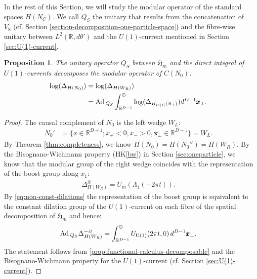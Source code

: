 \documentclass[12pt]{article}
\def\RR{{\mathbb R}}
\def\hm{\mathfrak{H}_m}
\def\Ad{{\hbox{\rm Ad\,}}}
\def\uone{{\rm U(1)}}
\newtheorem{proposition}[theorem]{Proposition}
\theoremstyle{remark}
\begin{document}
In the rest of this Section, we will study the modular operator of the standard spaces $H(N_C)$.
We call $Q_S$ the unitary that results from the concatenation of $V_{\mathrm S}$ (cf.\! Section \ref{section-decomposition-one-particle-space}) and the fibre-wise unitary between $L^2(\RR,d\theta')$ and the $U(1)$-current mentioned in Section \ref{sec:U(1)-current}.
	

  \begin{proposition}\label{pr:modular-operator-zero-space}
   The unitary operator $Q_S$ between $\hm$ and the direct integral of $U(1)$-currents decomposes the modular operator of $C(N_0)$:
    \begin{align*}
     \log(\Delta_{H(N_0)})&=\log(\Delta_{H(W_R)})\\&=\Ad_{Q_S}\int^{\oplus}_{\RR^{D-1}} \log(\Delta_{H_{U(1)}(\RR_+)})d^{D-1}\pmb{x}_\perp.
    \end{align*}
  \end{proposition}
  \begin{proof}
   The causal complement of $N_0$ is the left wedge $W_L$:
    \begin{align*}
     N_0'
     &=\{x\in \RR^{D+1}; x_+< 0,x_->0,\pmb{x}_\perp\in \RR^{D-1}\}=W_L.
    \end{align*}
   By Theorem \ref{thm:completeness}, we know $H(N_0)=H(N_0'')=H(W_R)$.
   By the Bisognano-Wichmann property (HK\ref{bw}) in Section \ref{sec:oneparticle},
   we know that the modular group of the right wedge coincides with the representation of the boost group along $x_1$:
   		\begin{align*}
   			 \Delta_{H(W_R)}^{it}= U_m(\Lambda_{1}(-2\pi t)).
   		\end{align*}
   	By \eqref{eq:non-const-dilations} the representation of the boost group is equivalent to
   	the constant dilation group of the $U(1)$-current on each fibre of the spatial decomposition of $\hm$ and hence:
   		\begin{align*}
   			\Ad_{Q_S}\Delta_{H(W_R)}^{-it}=\int^{\oplus}_{\RR^{D-1}} U_\uone(2\pi t,0)\,d^{D-1}\pmb{x}_\perp.
   		\end{align*}
   	The statement follows from \autoref{prop:functional-calculus-decomposable} and the Bisognano-Wichmann property for the $U(1)$-current
   	(cf.\! Section \ref{sec:U(1)-current}).
  \end{proof}
\end{document}
